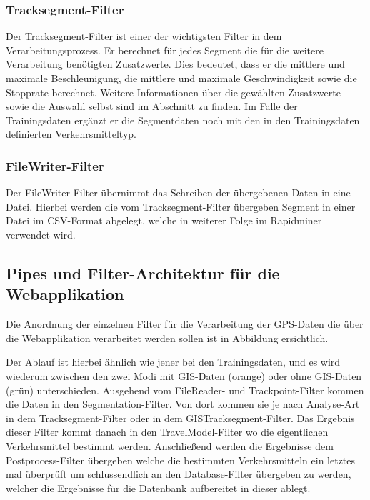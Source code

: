 \subsubsection{Tracksegment-Filter}
\label{tracksegmentFilter}
Der Tracksegment-Filter ist einer der wichtigsten Filter in dem Verarbeitungsprozess. Er berechnet für jedes Segment die für die weitere Verarbeitung benötigten Zusatzwerte. Dies bedeutet, dass er die mittlere und maximale Beschleunigung, die mittlere und maximale Geschwindigkeit sowie die Stopprate berechnet. Weitere Informationen über die gewählten Zusatzwerte sowie die Auswahl selbst sind im Abschnitt  zu finden.  Im Falle der Trainingsdaten ergänzt er die Segmentdaten noch mit den in den Trainingsdaten definierten Verkehrsmitteltyp.

\subsubsection{FileWriter-Filter}
Der FileWriter-Filter übernimmt das Schreiben der übergebenen Daten in eine Datei. Hierbei werden die vom Tracksegment-Filter übergeben Segment in einer Datei im CSV-Format abgelegt, welche in weiterer Folge im Rapidminer verwendet wird.

\subsection{Pipes und Filter-Architektur für die Webapplikation}
Die Anordnung der einzelnen Filter für die Verarbeitung der GPS-Daten die über die Webapplikation verarbeitet werden sollen ist in Abbildung  ersichtlich. 

Der Ablauf ist hierbei ähnlich wie jener bei den Trainingsdaten, und es wird wiederum zwischen den zwei Modi mit GIS-Daten (orange) oder ohne GIS-Daten (grün) unterschieden. Ausgehend vom FileReader- und Trackpoint-Filter kommen die Daten in den Segmentation-Filter. Von dort kommen sie je nach Analyse-Art in dem Tracksegment-Filter oder in dem GISTracksegment-Filter. Das Ergebnis dieser Filter kommt danach in den TravelModel-Filter wo die eigentlichen Verkehrsmittel bestimmt werden. Anschließend werden die Ergebnisse dem Postprocess-Filter übergeben welche die bestimmten Verkehrsmitteln ein letztes mal überprüft um schlussendlich an den Database-Filter übergeben zu werden, welcher die Ergebnisse für die Datenbank aufbereitet in dieser ablegt.


